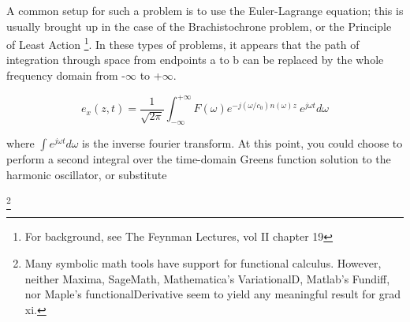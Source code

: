 \documentclass[paper.tex]{subfiles}
\begin{document}
A common setup for such a problem is to use the Euler-Lagrange equation; this is usually brought up in the case of the Brachistochrone problem, or the Principle of Least Action \footnote{For background, see The Feynman Lectures, vol II chapter 19}. In these types of problems, it appears that the path of integration through space from endpoints a to b can be replaced by the whole frequency domain from -$\infty$ to +$\infty$. 

$$ e_x(z,t) = \frac{1}{\sqrt{2 \pi}} \int_{-\infty}^{+\infty}{F(\omega) e^{- j (\omega/c_0)n(\omega)z}\ e^{j\omega t} d\omega} $$

where $\int e^{j \omega t} d\omega$ is the inverse fourier transform. At this point, you could choose to perform a second integral over the time-domain Greens function solution to the harmonic oscillator\cite{Complex2020}, or substitute 

\footnote{Many symbolic math tools have support for functional calculus. However, neither Maxima, SageMath, Mathematica's VariationalD, Matlab's Fundiff, nor Maple's functionalDerivative seem to yield any meaningful result for grad xi.}\\

%
%
%
%
%
%
%
%
%
%




%
%
%
%
%
%
\end{document}
